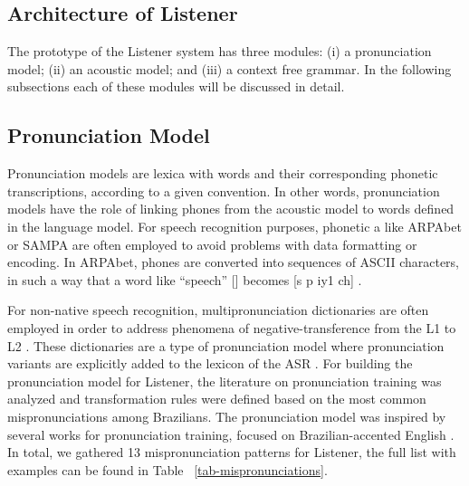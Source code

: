 \documentclass[twocolumn]{bmcart}%
\begin{document}
\subsection{Architecture of Listener}\label{architecture}
The prototype of the Listener system has three modules: (i) a pronunciation model; (ii) an acoustic model; and (iii) a context free grammar. In the following subsections each of these modules will be discussed in detail.

\subsection{Pronunciation Model}\label{pron_model}

Pronunciation models are lexica with words and their corresponding phonetic transcriptions, according to a given convention. In other words, pronunciation models have the role of linking phones from the acoustic model to words defined in the language model. For speech recognition purposes, phonetic a like ARPAbet or SAMPA are often employed to avoid problems with data formatting or encoding. In ARPAbet, phones are converted into sequences of ASCII characters, in such a way that a word like ``speech'' [] becomes [s p iy1 ch] \cite{CMUDict2008}.

For non-native speech recognition, multipronunciation dictionaries are often employed in order to address phenomena of negative-transference from the L1 to L2 \cite{Strik2001}. These dictionaries are a type of pronunciation model where pronunciation variants are explicitly added to the lexicon of the ASR \cite{Strik2001}. For building the pronunciation model for Listener, the literature on pronunciation training was analyzed and transformation rules were defined based on the most common mispronunciations among Brazilians. The pronunciation model was inspired by several works for pronunciation training, focused on Brazilian-accented English \citep{Zimmer2004, Zimmer2009, Cristofaro2015}. In total, we gathered 13 mispronunciation patterns for Listener, the full list with examples can be found in Table ~\ref{tab-mispronunciations}.
\end{document}
